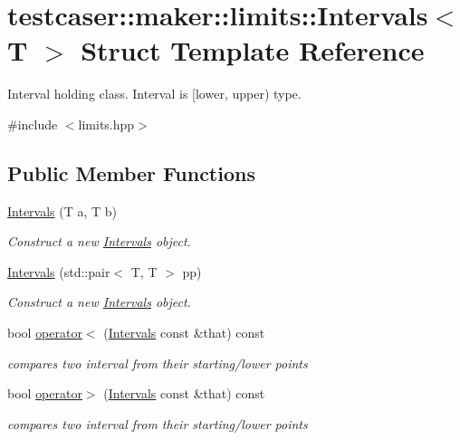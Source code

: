 \hypertarget{structtestcaser_1_1maker_1_1limits_1_1Intervals}{}\section{testcaser\+::maker\+::limits\+::Intervals$<$ T $>$ Struct Template Reference}
\label{structtestcaser_1_1maker_1_1limits_1_1Intervals}


Interval holding class. Interval is \mbox{[}lower, upper) type.  




{\ttfamily \#include $<$limits.\+hpp$>$}

\subsection*{Public Member Functions}
\begin{DoxyCompactItemize}
\item 
\mbox{\hyperlink{structtestcaser_1_1maker_1_1limits_1_1Intervals_a69fe886908002aa20f41ed886fc213ef}{Intervals}} (T a, T b)
\begin{DoxyCompactList}\small\item\em Construct a new \mbox{\hyperlink{structtestcaser_1_1maker_1_1limits_1_1Intervals}{Intervals}} object. \end{DoxyCompactList}\item 
\mbox{\hyperlink{structtestcaser_1_1maker_1_1limits_1_1Intervals_ad899dc031cbffd5247b9b39e23577a52}{Intervals}} (std\+::pair$<$ T, T $>$ pp)
\begin{DoxyCompactList}\small\item\em Construct a new \mbox{\hyperlink{structtestcaser_1_1maker_1_1limits_1_1Intervals}{Intervals}} object. \end{DoxyCompactList}\item 
bool \mbox{\hyperlink{structtestcaser_1_1maker_1_1limits_1_1Intervals_a1473f3baf9f15186106ff0854652bde5}{operator$<$}} (\mbox{\hyperlink{structtestcaser_1_1maker_1_1limits_1_1Intervals}{Intervals}} const \&that) const
\begin{DoxyCompactList}\small\item\em compares two interval from their starting/lower points \end{DoxyCompactList}\item 
bool \mbox{\hyperlink{structtestcaser_1_1maker_1_1limits_1_1Intervals_a01b35e7aa9a3a153b5514733cbcf056e}{operator$>$}} (\mbox{\hyperlink{structtestcaser_1_1maker_1_1limits_1_1Intervals}{Intervals}} const \&that) const
\begin{DoxyCompactList}\small\item\em compares two interval from their starting/lower points \end{DoxyCompactList}\end{DoxyCompactItemize}
